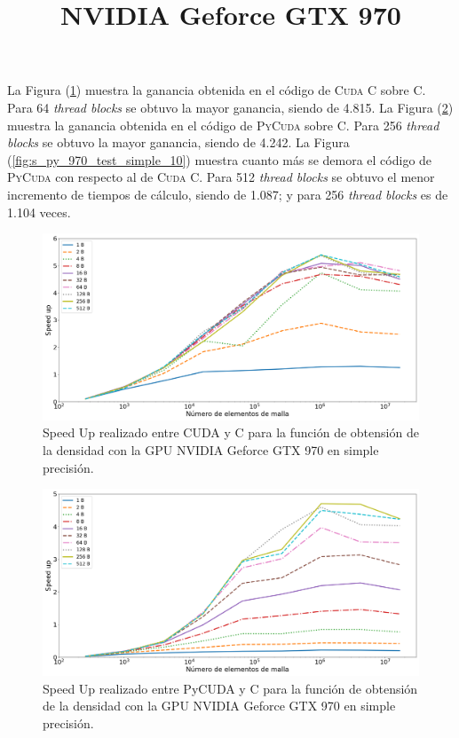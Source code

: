 \title{\textbf{NVIDIA Geforce GTX 970}}

La Figura (\ref{fig:s_cuda_970_test_simple_10}) muestra la ganancia obtenida en el código de \textsc{Cuda C} sobre \textsc{C}. Para 64 \textit{thread blocks} se obtuvo la mayor ganancia, siendo de 4.815. La Figura (\ref{fig:s_py_c_970_test_simple_10}) muestra la ganancia obtenida en el código de \textsc{PyCuda} sobre \textsc{C}. Para 256 \textit{thread blocks} se obtuvo la mayor ganancia, siendo de 4.242. La Figura (\ref{fig:s_py_970_test_simple_10}) muestra cuanto más se demora el código de \textsc{PyCuda} con respecto al de \textsc{Cuda C}. Para 512  \textit{thread blocks} se obtuvo el menor incremento de tiempos de cálculo, siendo de 1.087; y para 256 \textit{thread blocks} es de 1.104 veces.

\begin{figure}[htbp]
	\centering
	\includegraphics[width=\textwidth]{figs/cap4/s_cuda_970_test_simple_10}
	\caption{Speed Up realizado entre CUDA y C para la función de obtensión de la densidad con la GPU NVIDIA Geforce GTX 970 en simple precisión.} 
	\label{fig:s_cuda_970_test_simple_10}	
\end{figure}
\newpage
\begin{figure}[htbp]
	\centering
	\includegraphics[width=\textwidth]{figs/cap4/s_py_c_970_test_simple_10}
	\caption{Speed Up realizado entre PyCUDA y C para la función de obtensión de la densidad con la GPU NVIDIA Geforce GTX 970 en simple precisión.} 
	\label{fig:s_py_c_970_test_simple_10}	
\end{figure}

